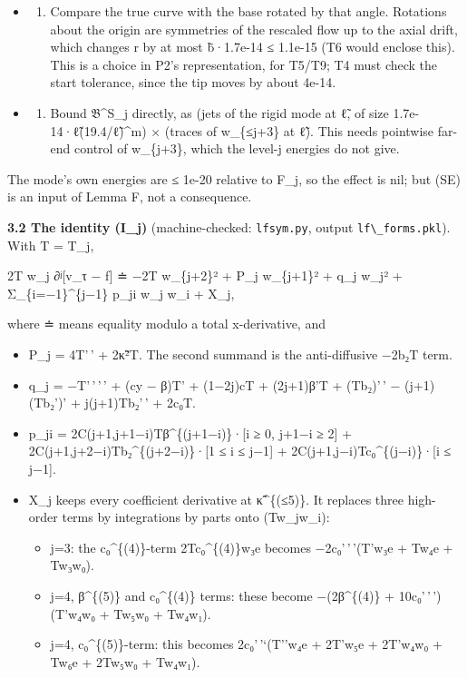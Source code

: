 \documentclass[
]{article}
\providecommand{\tightlist}{%
  \setlength{\itemsep}{0pt}\setlength{\parskip}{0pt}}
\begin{document}
\begin{itemize}
\item
  \begin{enumerate}
  \def\labelenumi{(\alph{enumi})}
  \tightlist
  \item
    Compare the true curve with the base rotated by that angle.
    Rotations about the origin are symmetries of the rescaled flow up to
    the axial drift, which changes r by at most
    \textbar b̃\textbar·1.7e-14 ≤ 1.1e-15 (T6 would enclose this). This
    is a choice in P2's representation, for T5/T9; T4 must check the
    start tolerance, since the tip moves by about 4e-14.
  \end{enumerate}
\item
  \begin{enumerate}
  \def\labelenumi{(\alph{enumi})}
  \setcounter{enumi}{1}
  \tightlist
  \item
    Bound 𝔅\^{}S\_j directly, as (jets of the rigid mode at ℓ̃, of size
    1.7e-14·ℓ̃(19.4/ℓ̃)\^{}m) × (traces of w\_\{≤j+3\} at ℓ̃). This needs
    pointwise far-end control of w\_\{j+3\}, which the level-j energies
    do not give.
  \end{enumerate}
\end{itemize}

The mode's own energies are ≤ 1e-20 relative to F\_j, so the effect is
nil; but (SE) is an input of Lemma F, not a consequence.

\textbf{3.2 The identity (I\_j)} (machine-checked: \texttt{lfsym.py},
output \texttt{lf\textbackslash{}\_forms.pkl}). With T = T\_j,

2T w\_j ∂ʲ{[}v\_τ − f{]} ≐ −2T w\_\{j+2\}² + P\_j w\_\{j+1\}² + q\_j
w\_j² + Σ\_\{i=−1\}\^{}\{j−1\} p\_ji w\_j w\_i + X\_j,

where ≐ means equality modulo a total x-derivative, and

\begin{itemize}
\tightlist
\item
  P\_j = 4T'\,' + 2κ̃²T. The second summand is the anti-diffusive −2b₂T
  term.
\item
  q\_j = −T'\,'\,'\,' + (cy − β)T' + (1−2j)cT + (2j+1)β'T + (Tb₂)'\,' −
  (j+1)(Tb₂')' + j(j+1)Tb₂'\,' + 2c₀T.
\item
  p\_ji = 2C(j+1,j+1−i)Tβ\^{}\{(j+1−i)\}·{[}i ≥ 0, j+1−i ≥ 2{]} +
  2C(j+1,j+2−i)Tb₂\^{}\{(j+2−i)\}·{[}1 ≤ i ≤ j−1{]} +
  2C(j+1,j−i)Tc₀\^{}\{(j−i)\}·{[}i ≤ j−1{]}.
\item
  X\_j keeps every coefficient derivative at κ̃\^{}\{(≤5)\}. It replaces
  three high-order terms by integrations by parts onto (Tw\_jw\_i):

  \begin{itemize}
  \tightlist
  \item
    j=3: the c₀\^{}\{(4)\}-term 2Tc₀\^{}\{(4)\}w₃e becomes
    −2c₀'\,'\,'(T'w₃e + Tw₄e + Tw₃w₀).
  \item
    j=4, β\^{}\{(5)\} and c₀\^{}\{(4)\} terms: these become
    −(2β\^{}\{(4)\} + 10c₀'\,'\,')(T'w₄w₀ + Tw₅w₀ + Tw₄w₁).
  \item
    j=4, c₀\^{}\{(5)\}-term: this becomes 2c₀'\,'`(T''w₄e + 2T'w₅e +
    2T'w₄w₀ + Tw₆e + 2Tw₅w₀ + Tw₄w₁).
  \end{itemize}
\end{itemize}
\end{document}
